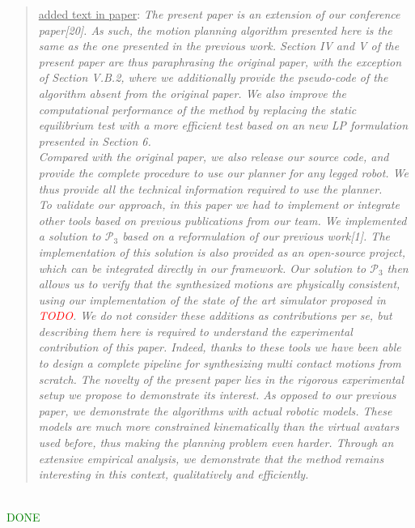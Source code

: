 \documentclass[a4paper]{article}
\newcommand{\done}[0]{\textcolor{green}{DONE}}
\newcommand\as[1]{\begin{quote} \underline{answer}: {#1}\end{quote} \leavevmode \\ }
\newcommand\qt[1]{\begin{quote} \underline{added text in paper}: \textit{#1}\end{quote} \leavevmode \\ }
\begin{document}
\qt{The present paper is an extension of our conference paper[20]. As such, the motion planning algorithm presented here is the same as the one presented in the
previous work. Section IV and V of the present paper are thus paraphrasing the original paper, with the exception of Section V.B.2, where we additionally provide the pseudo-code of the algorithm absent from the original paper. We also improve the computational performance of the method by replacing the static equilibrium test with a more efficient test based on an new LP formulation presented in Section 6. \\
Compared with the original paper, we also release our source code, and provide the complete procedure to use our planner for any legged robot. We thus provide
all the technical information required to use the planner. \\
To validate our approach, in this paper we had to implement or integrate other tools based on previous publications from our team. We implemented a solution to $\mathcal{P}_3$ based on a reformulation of our previous work[1]. The implementation of this solution is also provided as an open-source project, which can be integrated directly in our framework. Our solution to $\mathcal{P}_3$ then allows us to verify that the synthesized motions are physically consistent, using our implementation of the state of the art simulator proposed in \textcolor{red}{TODO}.
We do not consider these additions as contributions per se, but describing them here is required to understand the experimental contribution of this paper.
Indeed, thanks to these tools we have been able to design a complete pipeline for synthesizing multi contact motions from scratch.
The novelty of the present paper lies in the rigorous experimental setup we propose to demonstrate its interest.
As opposed to our previous paper, we demonstrate the algorithms with actual robotic models. These models are much more constrained kinematically than the virtual avatars used before,
thus making the planning problem even harder. Through an extensive empirical analysis, we demonstrate that the method remains interesting in this context, qualitatively and efficiently.}
\done

\end{document}
